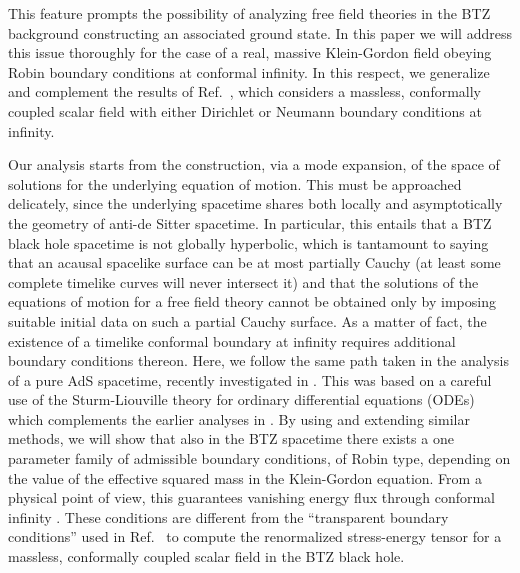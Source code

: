 \documentclass[aps, prd, amsmath, floats, floatfix, twocolumn, nofootinbib, superscriptaddress, showpacs]{revtex4-1}
\begin{document}
This feature prompts the possibility of analyzing free field
theories in the BTZ background constructing an associated ground state.
In this paper we will address this issue thoroughly for the case
of a real, massive Klein-Gordon field obeying Robin boundary conditions
at conformal infinity. In this respect, we generalize and complement the results
of Ref.~\cite{Lifschytz:1993eb}, which considers a massless,
conformally coupled scalar field with either Dirichlet or Neumann
boundary conditions at infinity.

Our analysis starts from the construction, via a mode expansion, of the
space of solutions for the underlying equation of motion. This must be
approached delicately, since the underlying spacetime shares both
locally and asymptotically the geometry of anti-de Sitter spacetime. In
particular, this entails that a BTZ black hole spacetime is not globally
hyperbolic, which is tantamount to saying that an acausal spacelike
surface can be at most partially Cauchy (at least some complete timelike
curves will never intersect it) and that the solutions of the equations
of motion for a free field theory cannot be obtained only by imposing
suitable initial data on such a partial Cauchy surface. As a matter of
fact, the existence of a timelike conformal boundary at infinity requires
additional boundary conditions thereon. Here, we follow the same path 
taken in the analysis of a pure AdS spacetime, recently investigated in
\cite{Dappiaggi:2016fwc,Dappiaggi:2017wvj}. This was based on
a careful use of the Sturm-Liouville theory for ordinary differential
equations (ODEs) \cite{Zettl:2005,weidmann} which complements the earlier analyses in \cite{Ishibashi:2003jd,Ishibashi:2004wx,Seggev:2003rp}. By using and extending
similar methods, we will show that also in the BTZ spacetime there
exists a one parameter family of admissible boundary conditions, of
Robin type, depending on the value of the effective squared mass in the
Klein-Gordon equation. From a physical point of view, this guarantees
vanishing energy flux through conformal infinity \cite{Ferreira:2017}.
These conditions are different from the ``transparent boundary
conditions'' used in Ref.~\cite{Steif:1993zv} to compute the
renormalized stress-energy tensor for a massless, conformally coupled
scalar field in the BTZ black hole.
\end{document}
